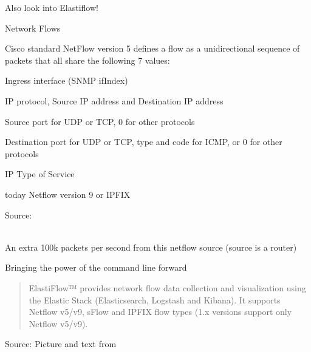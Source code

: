 \documentclass[Screen16to9,17pt]{foils}
\begin{document}
Also look into Elastiflow! 



\begin{list1}
\item Network Flows
\item Cisco standard NetFlow version 5 defines a flow as a unidirectional sequence of packets that all share the following 7 values:
\begin{list2}
\item Ingress interface (SNMP ifIndex)
\item IP protocol, Source IP address and Destination IP address
\item Source port for UDP or TCP, 0 for other protocols
\item Destination port for UDP or TCP, type and code for ICMP, or 0 for other protocols
\item IP Type of Service
\end{list2}
\item today Netflow version 9 or IPFIX
\end{list1}

Source: \\{\footnotesize
{}\\
}








\centerline{An extra 100k packets per second from this netflow source (source is a router)}



\centerline{Bringing the power of the command line forward}



\begin{quote}
  ElastiFlow™ provides network flow data collection and visualization using the Elastic Stack (Elasticsearch, Logstash and Kibana). It supports Netflow v5/v9, sFlow and IPFIX flow types (1.x versions support only Netflow v5/v9).
\end{quote}
Source: Picture and text from  \\
\end{document}
